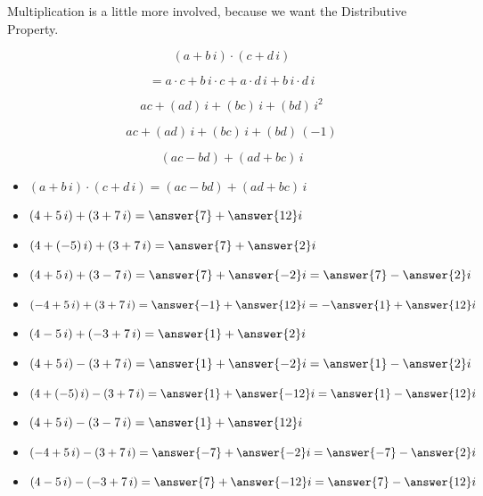 \documentclass{ximera}
\begin{document}
Multiplication is a little more involved, because we want the Distributive Property.

\[
(a + b \, i) \cdot (c + d \, i) 
\]

\[
= a \cdot c + b \, i \cdot c + a \cdot d \, i + b \, i \cdot d \, i
\]

\[
a c  + (a d) \, i + (b c) \, i + (b d) \, i^2
\]


\[
a c  + (a d) \, i + (b c) \, i + (b d) \, (-1)
\]


\[
(a c - b d) + (a d + b c) \, i 
\]



\begin{itemize}
	\item $(a + b \, i) \cdot (c + d \, i) = (ac - bd) + (ad + bc) \, i$
\end{itemize}










\begin{question}


\begin{itemize}
\item   $(4 + 5 \, i) + (3 + 7 \, i) = \answer{7} + \answer{12} i$
\item   $(4 + (-5) \, i) + (3 + 7 \, i) = \answer{7} + \answer{2} i$
\item   $(4 + 5 \, i) + (3 - 7 \, i) = \answer{7} + \answer{-2} i = \answer{7} - \answer{2} i$
\item   $(-4 + 5 \, i) + (3 + 7 \, i) = \answer{-1} + \answer{12} i = -\answer{1} + \answer{12} i$
\item   $(4 - 5 \, i) + (-3 + 7 \, i) = \answer{1} + \answer{2} i$
\end{itemize}



\end{question}





\begin{question}


\begin{itemize}
\item   $(4 + 5 \, i) - (3 + 7 \, i) = \answer{1} + \answer{-2} i = \answer{1} - \answer{2} i$
\item   $(4 + (-5) \, i) - (3 + 7 \, i) = \answer{1} + \answer{-12} i = \answer{1} - \answer{12} i$
\item   $(4 + 5 \, i) - (3 - 7 \, i) = \answer{1} + \answer{12} i$
\item   $(-4 + 5 \, i) - (3 + 7 \, i) = \answer{-7} + \answer{-2} i = \answer{-7} - \answer{2} i$
\item   $(4 - 5 \, i) - (-3 + 7 \, i) = \answer{7} + \answer{-12} i = \answer{7} - \answer{12} i$
\end{itemize}



\end{question}
\end{document}
